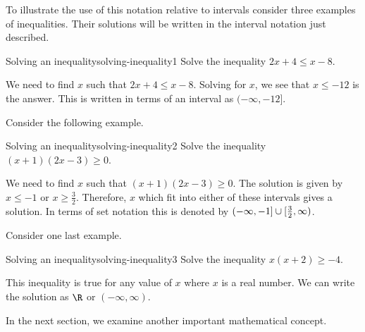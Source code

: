 To illustrate the use of this notation relative to intervals consider three
examples of inequalities. Their solutions will be written in the interval notation
just described.

\begin{example}{Solving an inequality}{solving-inequality1}
Solve the inequality $2x+4\leq x-8$.
\end{example}

\begin{solution}
We need to find $x$ such that $2x+4\leq x-8$. Solving for $x$, we see that
$x\leq -12$ is the answer. This is written in terms of an interval as $(-\infty ,-12]$.
\end{solution}

Consider the following example.

\begin{example}{Solving an inequality}{solving-inequality2}
Solve the inequality $(x+1) (2x-3) \geq0$.
\end{example}

\begin{solution}
We need to find $x$ such that $(x+1) (2x-3) \geq0$.
The solution is given by  $x\leq -1$ or $x\geq \frac{3}{2}$. Therefore,
$x$ which fit into either of these intervals gives a solution. In terms of set notation this is denoted by $(-\infty ,-1]\cup
[ \vspace{0.05in}\frac{3}{2},\infty )$.
\end{solution}

Consider one last example.

\begin{example}{Solving an inequality}{solving-inequality3}
Solve the inequality $x (x+2) \geq-4$.
\end{example}

\begin{solution}
This inequality is true for any value of $x$ where $x$ is a real number. We can write the solution as $\R$ or $(
-\infty ,\infty)$.
\end{solution}

In the next section, we examine another important mathematical concept.
